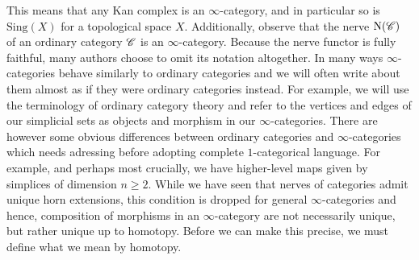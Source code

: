 \documentclass[../thesis.tex]{subfiles}
\begin{document}
This means that any Kan complex is an $\infty$-category, and in particular so is $\mathrm{Sing}(X)$ for a topological space $X$.
Additionally, observe that the nerve $\mathrm{N}(\mathscr{C})$ of an ordinary category $\mathscr{C}$ is an $\infty$-category.
Because the nerve functor is fully faithful, many authors choose to omit its notation altogether.
In many ways $\infty$-categories behave similarly to ordinary categories and we will often write about them almost as if they were ordinary categories instead.
For example, we will use the terminology of ordinary category theory and refer to the vertices and edges of our simplicial sets as objects and morphism in our $\infty$-categories.
There are however some obvious differences between ordinary categories and $\infty$-categories which needs adressing before adopting complete $1$-categorical language.
For example, and perhaps most crucially, we have higher-level maps given by simplices of dimension $n\geq 2$.
While we have seen that nerves of categories admit unique horn extensions, this condition is dropped for general $\infty$-categories and hence, composition of morphisms in an $\infty$-category are not necessarily unique, but rather unique up to homotopy.
Before we can make this precise, we must define what we mean by homotopy.
\end{document}
